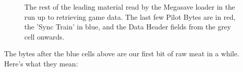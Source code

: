 \begin{figure}[H]
{\begin{adjustbox}{width=10cm,center}
    \end{adjustbox}
  }\caption{The rest of the leading material read by the Megasave loader in the run up to retrieving game data. The last few Pilot Bytes are in red, 
the 'Sync Train' in blue, and the Data Header fields from the grey cell onwards.}
\end{figure}
\vspace{-0.5cm}
The bytes after the blue cells above are our first bit of raw meat in a while. Here's what they mean:

